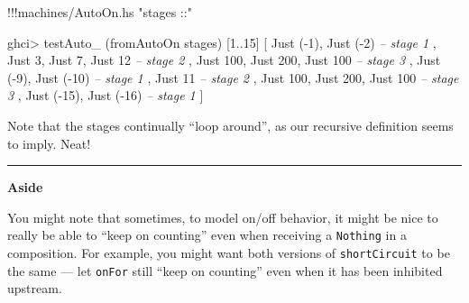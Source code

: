 \documentclass[]{article}
\newenvironment{Shaded}{}{}
\newcommand{\DataTypeTok}[1]{\textcolor[rgb]{0.56,0.13,0.00}{{#1}}}
\newcommand{\DecValTok}[1]{\textcolor[rgb]{0.25,0.63,0.44}{{#1}}}
\newcommand{\StringTok}[1]{\textcolor[rgb]{0.25,0.44,0.63}{{#1}}}
\newcommand{\CommentTok}[1]{\textcolor[rgb]{0.38,0.63,0.69}{\textit{{#1}}}}
\newcommand{\FunctionTok}[1]{\textcolor[rgb]{0.02,0.16,0.49}{{#1}}}
\newcommand{\NormalTok}[1]{{#1}}
\begin{document}
\begin{Shaded}
\begin{Highlighting}[]
\FunctionTok{!!!}\NormalTok{machines}\FunctionTok{/}\NormalTok{AutoOn.hs }\StringTok{"stages ::"}
\end{Highlighting}
\end{Shaded}

\begin{Shaded}
\begin{Highlighting}[]
\NormalTok{ghci}\FunctionTok{>} \NormalTok{testAuto_ (fromAutoOn stages) [}\DecValTok{1}\FunctionTok{..}\DecValTok{15}\NormalTok{]}
\NormalTok{[ }\DataTypeTok{Just} \NormalTok{(}\FunctionTok{-}\DecValTok{1}\NormalTok{), }\DataTypeTok{Just} \NormalTok{(}\FunctionTok{-}\DecValTok{2}\NormalTok{)              }\CommentTok{-- stage 1}
\NormalTok{, }\DataTypeTok{Just} \DecValTok{3}\NormalTok{, }\DataTypeTok{Just} \DecValTok{7}\NormalTok{, }\DataTypeTok{Just} \DecValTok{12}           \CommentTok{-- stage 2}
\NormalTok{, }\DataTypeTok{Just} \DecValTok{100}\NormalTok{, }\DataTypeTok{Just} \DecValTok{200}\NormalTok{, }\DataTypeTok{Just} \DecValTok{100}      \CommentTok{-- stage 3}
\NormalTok{, }\DataTypeTok{Just} \NormalTok{(}\FunctionTok{-}\DecValTok{9}\NormalTok{), }\DataTypeTok{Just} \NormalTok{(}\FunctionTok{-}\DecValTok{10}\NormalTok{)             }\CommentTok{-- stage 1}
\NormalTok{, }\DataTypeTok{Just} \DecValTok{11}                           \CommentTok{-- stage 2}
\NormalTok{, }\DataTypeTok{Just} \DecValTok{100}\NormalTok{, }\DataTypeTok{Just} \DecValTok{200}\NormalTok{, }\DataTypeTok{Just} \DecValTok{100}      \CommentTok{-- stage 3}
\NormalTok{, }\DataTypeTok{Just} \NormalTok{(}\FunctionTok{-}\DecValTok{15}\NormalTok{), }\DataTypeTok{Just} \NormalTok{(}\FunctionTok{-}\DecValTok{16}\NormalTok{)            }\CommentTok{-- stage 1}
\NormalTok{]}
\end{Highlighting}
\end{Shaded}

Note that the stages continually ``loop around'', as our recursive
definition seems to imply. Neat!

\begin{center}\rule{0.5\linewidth}{\linethickness}\end{center}

\textbf{Aside}

You might note that sometimes, to model on/off behavior, it might be
nice to really be able to ``keep on counting'' even when receiving a
\texttt{Nothing} in a composition. For example, you might want both
versions of \texttt{shortCircuit} to be the same --- let \texttt{onFor}
still ``keep on counting'' even when it has been inhibited upstream.
\end{document}
